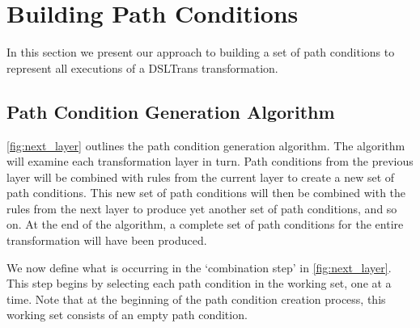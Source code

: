 \section{Building Path Conditions}
\label{sec:building_pcs}

In this section we present our approach to building a set of path conditions to represent all executions of a DSLTrans transformation.



\subsection{Path Condition Generation Algorithm}
\label{sec:gen_all_pcs}

\cref{fig:next_layer} outlines the path condition generation algorithm. The algorithm will examine each transformation layer in turn. Path conditions from the previous layer will be combined with rules from the current layer to create a new set of path conditions. This new set of path conditions will then be combined with the rules from the next layer to produce yet another set of path conditions, and so on. At the end of the algorithm, a complete set of path conditions for the entire transformation will have been produced. 

%        
%       

We now define what is occurring in the `combination step' in \cref{fig:next_layer}. This step begins by selecting each path condition in the working set, one at a time. Note that at the beginning of the path condition creation process, this working set consists of an empty path condition.

